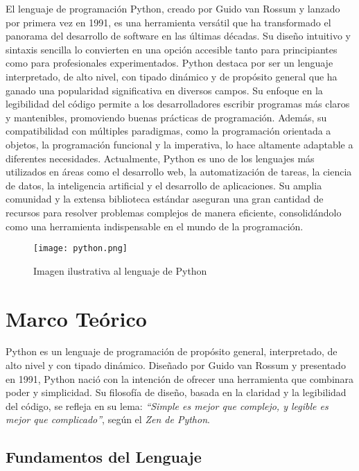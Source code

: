 \documentclass[conference]{IEEEtran}
\begin{document}
    El lenguaje de programación Python, creado por Guido van Rossum y lanzado por primera vez en 1991, es una herramienta versátil que ha transformado el panorama del desarrollo de software en las últimas décadas. Su diseño intuitivo y sintaxis sencilla lo convierten en una opción accesible tanto para principiantes como para profesionales experimentados.
    Python destaca por ser un lenguaje interpretado, de alto nivel, con tipado dinámico y de propósito general que ha ganado una popularidad significativa en diversos campos. Su enfoque en la legibilidad del código permite a los desarrolladores escribir programas más claros y mantenibles, promoviendo buenas prácticas de programación. Además, su compatibilidad con múltiples paradigmas, como la programación orientada a objetos, la programación funcional y la imperativa, lo hace altamente adaptable a diferentes necesidades.
    Actualmente, Python es uno de los lenguajes más utilizados en áreas como el desarrollo web, la automatización de tareas, la ciencia de datos, la inteligencia artificial y el desarrollo de aplicaciones. Su amplia comunidad y la extensa biblioteca estándar aseguran una gran cantidad de recursos para resolver problemas complejos de manera eficiente, consolidándolo como una herramienta indispensable en el mundo de la programación.
    

    \begin{figure}[h]
    	\centering
    	\texttt{[image: python.png]}
    	\caption{Imagen ilustrativa al lenguaje de Python}
            \label{Python}
    \end{figure}

\section{Marco Teórico}

Python es un lenguaje de programación de propósito general, interpretado, de alto nivel y con tipado dinámico. Diseñado por Guido van Rossum y presentado en 1991, Python nació con la intención de ofrecer una herramienta que combinara poder y simplicidad. Su filosofía de diseño, basada en la claridad y la legibilidad del código, se refleja en su lema: \emph{“Simple es mejor que complejo, y legible es mejor que complicado”}, según el \emph{Zen de Python}.  

\subsection{Fundamentos del Lenguaje}
\end{document}
